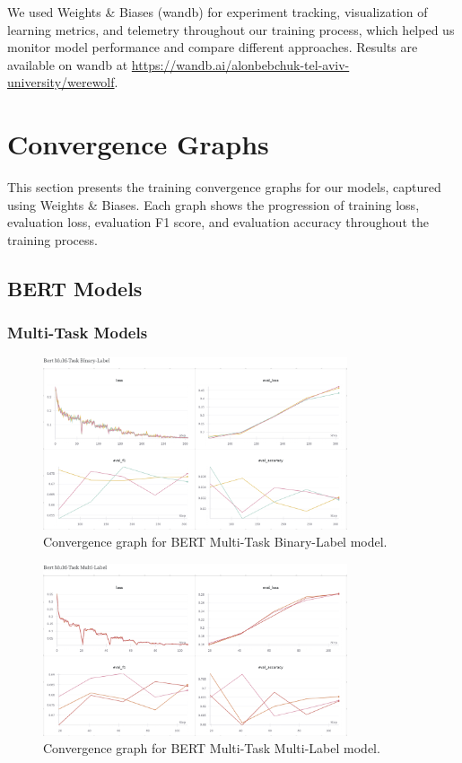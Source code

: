 \documentclass{article}
\begin{document}
We used Weights \& Biases (wandb) for experiment tracking, visualization of learning metrics, and telemetry throughout our training process, which helped us monitor model performance and compare different approaches. Results are available on wandb at \url{https://wandb.ai/alonbebchuk-tel-aviv-university/werewolf}.

\section{Convergence Graphs}
This section presents the training convergence graphs for our models, captured using Weights \& Biases. Each graph shows the progression of training loss, evaluation loss, evaluation F1 score, and evaluation accuracy throughout the training process.

\subsection{BERT Models}

\subsubsection{Multi-Task Models}
\begin{figure}[H]
    \centering
    \includegraphics[width=0.8\textwidth]{convergence_graphs/bert_mtbl.png}
    \caption{Convergence graph for BERT Multi-Task Binary-Label model.}
    \label{fig:bert_mtbl}
\end{figure}

\begin{figure}[H]
    \centering
    \includegraphics[width=0.8\textwidth]{convergence_graphs/bert_mtml.png}
    \caption{Convergence graph for BERT Multi-Task Multi-Label model.}
    \label{fig:bert_mtml}
\end{figure}
\end{document}
